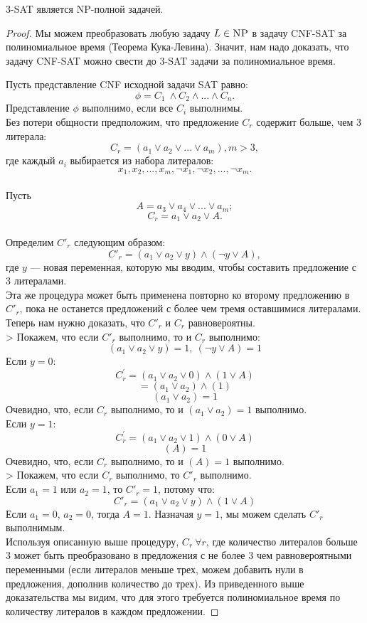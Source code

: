     \begin{Thm}
        \textsc{3-SAT} является \textsc{NP}-полной задачей.
    \end{Thm}
    \begin{proof}
        Мы можем преобразовать любую задачу $L \in \textsc{NP}$ в задачу \textsc{CNF-SAT} за полиномиальное время (Теорема Кука-Левина). Значит, нам надо доказать, что задачу \textsc{CNF-SAT} можно свести до \textsc{3-SAT} задачи за полиномиальное время.

        Пусть представление \textsc{CNF} исходной задачи \textsc{SAT} равно:
        $$\phi = C_1 \ \wedge C_2 \wedge ... \wedge C_n.$$ Представление $\phi$ выполнимо, если все $C_i$ выполнимы.\\
        Без потери общности предположим, что предложение $C_r$ содержит больше, чем 3 литерала:
        $$C_r = (a_1 \vee a_2 \vee ... \vee a_m), m>3,$$ где каждый $a_i$ выбирается из набора литералов:  $$x_1, x_2, ...,x_m, \neg x_1, \neg x_2, ..., \neg x_m.$$\\
        Пусть $$A = a_3 \vee a_4 \vee ... \vee a_m;$$
        $$C_r = a_1 \vee a_2 \vee A.$$\\
        Определим $C'_r$ следующим образом:
        $$C'_r = (a_1 \vee a_2 \vee y) \wedge (\neg y \vee A),$$ где $y$ --- новая переменная, которую мы вводим, чтобы составить предложение с 3 литералами.\\
        Эта же процедура может быть применена повторно ко второму предложению в $C'_r$, пока не останется предложений с более чем тремя оставшимися литералами.\\
        Теперь нам нужно доказать, что $C'_r$ и $C_r$ равновероятны.\\
        > Покажем, что если $C'_r$ выполнимо, то и $C_r$ выполнимо:
        $$(a_1 \vee a_2 \vee y)=1,\ (\neg y \vee A) = 1$$
        Если $y = 0$:
        $$C_r^\prime = (a_1 \vee a_2 \vee 0) \wedge (1 \vee A)$$
        $$ = (a_1 \vee a_2) \wedge (1) $$
        $$(a_1 \vee a_2) = 1$$
        Очевидно, что, если $C_r$ выполнимо, то и $(a_1 \vee a_2) = 1$ выполнимо.\\
        Если $y=1$:
        $$C_r^\prime = (a_1 \vee a_2 \vee 1) \wedge (0 \vee A)$$
        $$(A) = 1$$
        Очевидно, что, если $C_r$ выполнимо, то и $(A) = 1$ выполнимо.\\
        > Покажем, что если $C_r$ выполнимо, то $C'_r$ выполнимо.\\
        Если $a_1 = 1$ или $a_2 = 1$, то $C'_r = 1$, потому что:
        $$C'_r = (a_1 \vee a_2 \vee y) \wedge (1 \vee A) $$
        Если $a_1 = 0$, $a_2 = 0$, тогда $A = 1$. Назначая $y = 1$, мы можем сделать $C'_r$ выполнимым.\\
        Используя описанную выше процедуру, $C_r \ \forall r$, где количество литералов больше 3 может быть преобразовано в предложения с не более 3 чем равновероятными переменными (если литералов меньше трех, можем добавить нули в предложения, дополнив количество до трех). Из приведенного выше доказательства мы видим, что для этого требуется полиномиальное время по количеству литералов в каждом предложении.
    \end{proof}
